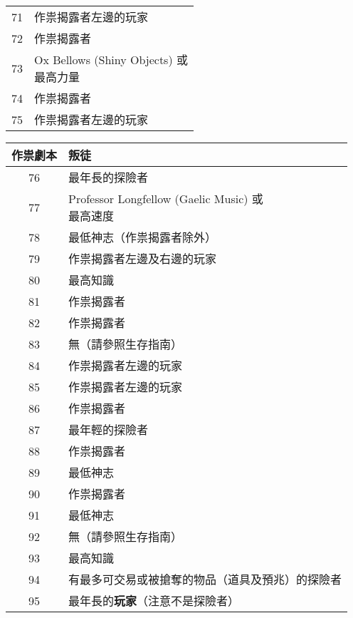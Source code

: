 \begin{center}
\begin{minipage}[t]{.45\textwidth}
\begin{tabular}[t]{ c l }
        71 & 作祟揭露者左邊的玩家 \\
        72 & 作祟揭露者 \\
        73 & \makecell[tl]{Ox Bellows (Shiny Objects) 或 \\ 最高力量 } \\
        74 & 作祟揭露者 \\
        75 & 作祟揭露者左邊的玩家 \\
    \end{tabular}
  \end{minipage}\hfil
  \begin{minipage}[t]{.45\textwidth}
    \renewcommand{\arraystretch}{1.5}
    \begin{tabular}[t]{ c l }
      \toprule
        \bfseries 作祟劇本 & \bfseries 叛徒 \\[.5ex]
      \midrule
        76 & 最年長的探險者 \\
        77 & \makecell[tl]{Professor Longfellow (Gaelic Music) 或 \\ 最高速度 } \\
        78 & 最低神志（作祟揭露者除外） \\
        79 & 作祟揭露者左邊及右邊的玩家 \\
        80 & 最高知識 \\

        81 & 作祟揭露者 \\
        82 & 作祟揭露者 \\
        83 & 無（請參照生存指南）\\
        84 & 作祟揭露者左邊的玩家 \\
        85 & 作祟揭露者左邊的玩家 \\

        86 & 作祟揭露者 \\
        87 & 最年輕的探險者 \\
        88 & 作祟揭露者 \\
        89 & 最低神志 \\
        90 & 作祟揭露者 \\

        91 & 最低神志 \\
        92 & 無（請參照生存指南）\\
        93 & 最高知識 \\
        94 & \begin{minipage}[t]{15em}有最多可交易或被搶奪的物品（道具及預兆）的探險者\end{minipage} \\
        95 & 最年長的\textbf{玩家}（注意不是探險者） \\


\end{tabular}
\end{minipage}
\end{center}
